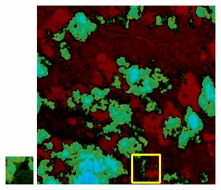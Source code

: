 \documentclass[10pt]{ctexart}
\begin{document}
\begin{multicols}{2}
\begin{figure}[H]
{\begin{minipage}[b]{0.15\linewidth}
            \includegraphics[width=1\linewidth]{../log/spoon2/cut/tmp_cut_LC80350192014190LGN00_06561_spectral.jpg}\vspace{4pt}
            \includegraphics[width=1\linewidth]{../log/spoon2/cut/LC80980712014024LGN00_15443_spectral.jpg}\vspace{4pt}

\end{minipage}}
\end{figure}
\end{multicols}
\end{document}
